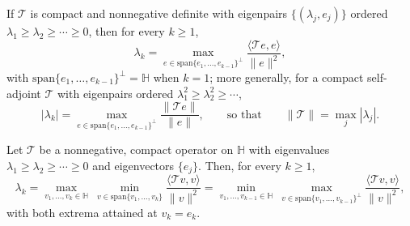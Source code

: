 \begin{theorem}
\label{thm:eigenvalue_max}
If $\mathcal{T}$ is compact and nonnegative definite with eigenpairs
$\{(\lambda_j,e_j)\}$ ordered $\lambda_1\geq\lambda_2\geq\cdots\geq 0$, then
for every $k\geq 1$,
\begin{equation}
\lambda_k = \max_{e\in\mathrm{span}\{e_1,\dots,e_{k-1}\}^\perp}
\frac{\langle\mathcal{T}e,e\rangle}{\|e\|^2},
\label{eq:rayleigh_max}
\end{equation}
with $\mathrm{span}\{e_1,\dots,e_{k-1}\}^\perp=\mathbb{H}$ when $k=1$; more
generally, for a compact self-adjoint $\mathcal{T}$ with eigenpairs ordered
$\lambda_1^2\geq\lambda_2^2\geq\cdots$,
\begin{equation}
|\lambda_k| = \max_{e\in\mathrm{span}\{e_1,\dots,e_{k-1}\}^\perp}
\frac{\|\mathcal{T}e\|}{\|e\|},
\qquad\text{so that}\qquad
\|\mathcal{T}\| = \max_j|\lambda_j|.
\label{eq:norm_eigenvalue}
\end{equation}
\end{theorem}


\begin{theorem}
\label{thm:courant_fischer}
Let $\mathcal{T}$ be a nonnegative, compact operator on $\mathbb{H}$ with
eigenvalues $\lambda_1\geq\lambda_2\geq\cdots\geq 0$ and eigenvectors
$\{e_j\}$. Then, for every $k\geq 1$,
\begin{equation}
\lambda_k = \max_{v_1,\dots,v_k\in\mathbb{H}}\
\min_{v\in\mathrm{span}\{v_1,\dots,v_k\}}\frac{\langle\mathcal{T}v,v
\rangle}{\|v\|^2}
= \min_{v_1,\dots,v_{k-1}\in\mathbb{H}}\
\max_{v\in\mathrm{span}\{v_1,\dots,v_{k-1}\}^\perp}\frac{\langle\mathcal{T}
v,v\rangle}{\|v\|^2},
\label{eq:courant_fischer}
\end{equation}
with both extrema attained at $v_k=e_k$.
\end{theorem}


